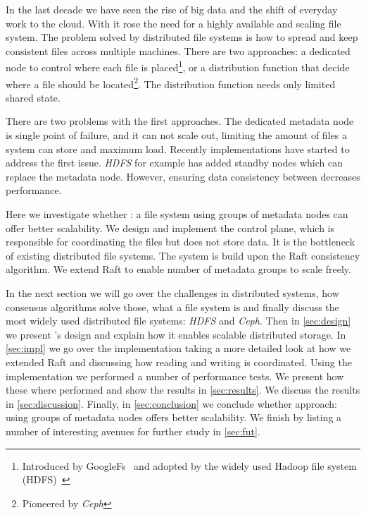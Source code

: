 In the last decade we have seen the rise of big data and the shift of everyday work to the cloud. With it rose the need for a highly available and scaling file system. The problem solved by distributed file systems is how to spread and keep consistent files across multiple machines. There are two approaches: a dedicated node to control where each file is placed\footnote{Introduced by GoogleFs~\cite{GFS,GFS_interview} and adopted by the widely used Hadoop file system (HDFS)~\cite{hdfs}}, or a distribution function that decide where a file should be located\footnote{Pioneered by \textit{Ceph}\cite{ceph}}. The distribution function needs only limited shared state.

There are two problems with the first approaches. The dedicated metadata node is single point of failure, and it can not scale out, limiting the amount of files a system can store and maximum load. Recently implementations have started to address the first issue. \textit{HDFS} for example has added standby nodes \cite{hdfs_ha_nfs, hdfs_ha_q} which can replace the metadata node. However, ensuring data consistency between decreases performance. 


Here we investigate whether \name{}: a file system using groups of metadata nodes can offer better scalability. We design and implement the control plane, which is responsible for coordinating the files but does not store data. It is the bottleneck of existing distributed file systems. The system is build upon the Raft\cite{raft} consistency algorithm. We extend Raft to enable number of metadata groups to scale freely. 

In the next section we will go over the challenges in distributed systems, how consensus algorithms solve those, what a file system is and finally discuss the most widely used distributed file systems: \textit{HDFS} and \textit{Ceph}. 
%
Then in \cref{sec:design} we present \name{}'s design and explain how it enables scalable distributed storage.
%
In \cref{sec:impl} we go over the implementation taking a more detailed look at how we extended Raft and discussing how reading and writing is coordinated.
%
Using the \name{} implementation we performed a number of performance tests. We present how these where performed and show the results in \cref{sec:results}.
% 
We discuss the results in \cref{sec:discussion}.
%
Finally, in \cref{sec:conclusion} we conclude whether \name{} approach: using groups of metadata nodes offers better scalability. 
%
We finish by listing a number of interesting avenues for further study in \cref{sec:fut}.
